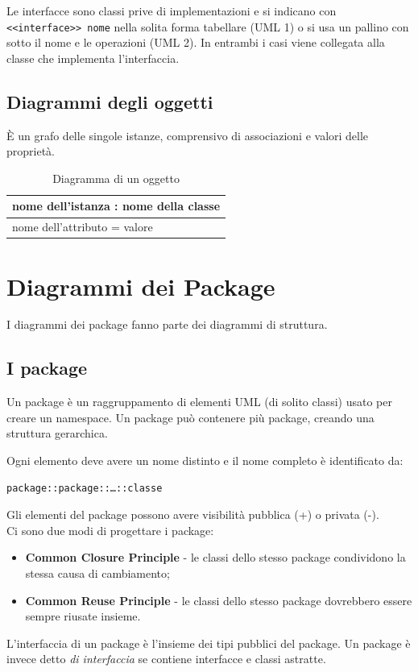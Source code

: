 Le interfacce sono classi prive di implementazioni e si indicano con \texttt{<<interface>> nome} nella solita forma tabellare (UML 1) o si usa un pallino con sotto il nome e le operazioni (UML 2). 
In entrambi i casi viene collegata alla classe che implementa l'interfaccia.

\subsection{Diagrammi degli oggetti}
\`E un grafo delle singole istanze, comprensivo di associazioni e valori delle proprietà.

\begin{table}[H]
\centering
\begin{tabular}{|l|}
\hline
nome dell'istanza : nome della classe \\
\hline
nome dell'attributo = valore \\
\hline
\end{tabular}
\caption{Diagramma di un oggetto}
\end{table}

\section{Diagrammi dei Package}
I diagrammi dei package fanno parte dei diagrammi di struttura. 

\subsection{I package}
Un package è un raggruppamento di elementi UML (di solito classi) usato per creare un namespace.
Un package può contenere più package, creando una struttura gerarchica.

Ogni elemento deve avere un nome distinto e il nome completo è identificato da:
\begin{verbatim}
package::package::…::classe
\end{verbatim}
Gli elementi del package possono avere visibilità pubblica (+) o privata (-). \\
Ci sono due modi di progettare i package:
\begin{itemize}
\item \textbf{Common Closure Principle} - le classi dello stesso package condividono la stessa causa di cambiamento;
\item \textbf{Common Reuse Principle} - le classi dello stesso package dovrebbero essere sempre riusate insieme.
\end{itemize}
L'interfaccia di un package è l'insieme dei tipi pubblici del package.
Un package è invece detto \textit{di interfaccia} se contiene interfacce e classi astratte. 


